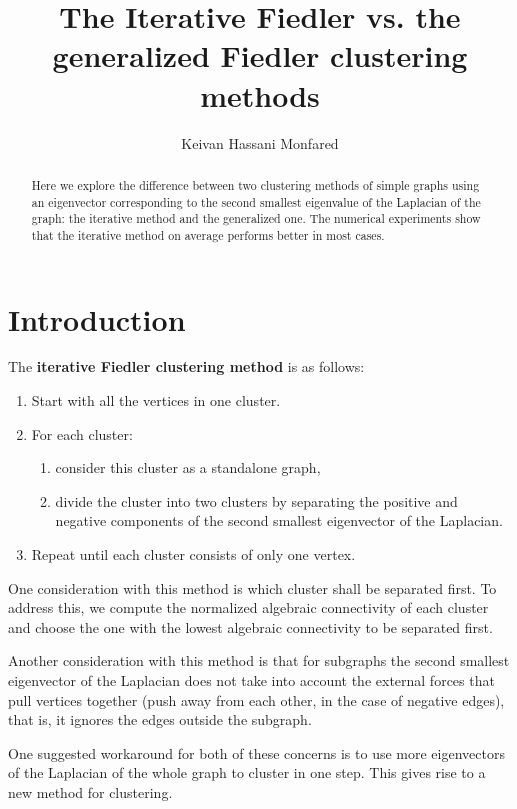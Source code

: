 \documentclass{amsart}
\title{The Iterative Fiedler vs. the generalized Fiedler clustering methods}
\author{Keivan Hassani Monfared}
\begin{document}
\maketitle

\begin{abstract}
	Here we explore the difference between two clustering methods of simple graphs using an eigenvector corresponding to the second smallest eigenvalue of the Laplacian of the graph: the iterative method and the generalized one. The numerical experiments show that the iterative method on average performs better in most cases.
\end{abstract}

\section{Introduction}
	The \textbf{iterative Fiedler clustering method} is as follows:
	\begin{enumerate}
		\item Start with all the vertices in one cluster.
		\item For each cluster:
		\begin{enumerate}
			\item consider this cluster as a standalone graph,
			\item divide the cluster into two clusters by separating the positive and negative components of the second smallest eigenvector of the Laplacian.
		\end{enumerate}
		\item Repeat until each cluster consists of only one vertex.
	\end{enumerate}
	
	One consideration with this method is which cluster shall be separated first. To address this, we compute the normalized algebraic connectivity of each cluster and choose the one with the lowest algebraic connectivity to be separated first.
	
	Another consideration with this method is that for subgraphs the second smallest eigenvector of the Laplacian does not take into account the external forces that pull vertices together (push away from each other, in the case of negative edges), that is, it ignores the edges outside the subgraph. 
	
	One suggested workaround for both of these concerns is to use more eigenvectors of the Laplacian of the whole graph to cluster in one step. This gives rise to a new method for clustering. 
	
\end{document}
